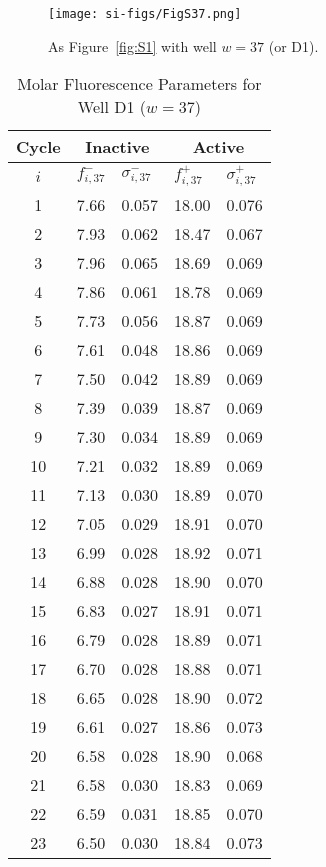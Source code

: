                 \begin{figure}
                    \centering
                    \texttt{[image: si-figs/FigS37.png]}
                    \caption{
                        As Figure~\ref{fig:S1} with well $w=37$ (or D1).
                    }
                \end{figure}
                \clearpage
    \begin{table}
        \caption{Molar Fluorescence Parameters for Well D1 ($w=37$)}
        \centering
        \begin{tabular}{c|ll|ll}
            Cycle & \multicolumn{2}{c|}{Inactive} & \multicolumn{2}{c}{Active} \\
            \hline
            $i$ & $f_{i,37}^{-}$ & $\sigma_{i,37}^{-}$ &  $f_{i,37}^{+}$ & $\sigma_{i,37}^{+}$ \\
            \hline
    1 & 7.66 & 0.057 & 18.00 & 0.076 \\
2 & 7.93 & 0.062 & 18.47 & 0.067 \\
3 & 7.96 & 0.065 & 18.69 & 0.069 \\
4 & 7.86 & 0.061 & 18.78 & 0.069 \\
5 & 7.73 & 0.056 & 18.87 & 0.069 \\
6 & 7.61 & 0.048 & 18.86 & 0.069 \\
7 & 7.50 & 0.042 & 18.89 & 0.069 \\
8 & 7.39 & 0.039 & 18.87 & 0.069 \\
9 & 7.30 & 0.034 & 18.89 & 0.069 \\
10 & 7.21 & 0.032 & 18.89 & 0.069 \\
11 & 7.13 & 0.030 & 18.89 & 0.070 \\
12 & 7.05 & 0.029 & 18.91 & 0.070 \\
13 & 6.99 & 0.028 & 18.92 & 0.071 \\
14 & 6.88 & 0.028 & 18.90 & 0.070 \\
15 & 6.83 & 0.027 & 18.91 & 0.071 \\
16 & 6.79 & 0.028 & 18.89 & 0.071 \\
17 & 6.70 & 0.028 & 18.88 & 0.071 \\
18 & 6.65 & 0.028 & 18.90 & 0.072 \\
19 & 6.61 & 0.027 & 18.86 & 0.073 \\
20 & 6.58 & 0.028 & 18.90 & 0.068 \\
21 & 6.58 & 0.030 & 18.83 & 0.069 \\
22 & 6.59 & 0.031 & 18.85 & 0.070 \\
23 & 6.50 & 0.030 & 18.84 & 0.073 \\

\end{tabular}
\end{table}
